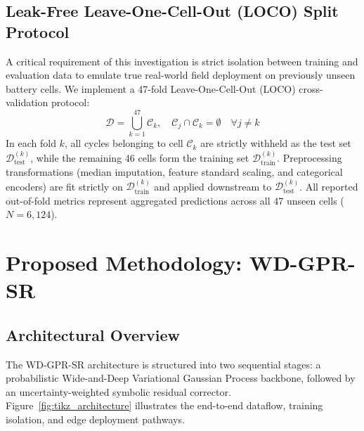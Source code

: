 \documentclass[a4paper,fleqn]{cas-sc}
\begin{document}
\subsection{Leak-Free Leave-One-Cell-Out (LOCO) Split Protocol}
A critical requirement of this investigation is strict isolation between training and evaluation data to emulate true real-world field deployment on previously unseen battery cells. We implement a 47-fold Leave-One-Cell-Out (LOCO) cross-validation protocol:
\begin{equation}
    \mathcal{D} = \bigcup_{k=1}^{47} \mathcal{C}_k, \quad \mathcal{C}_j \cap \mathcal{C}_k = \emptyset \quad \forall j \neq k
\end{equation}
In each fold $k$, all cycles belonging to cell $\mathcal{C}_k$ are strictly withheld as the test set $\mathcal{D}_{\text{test}}^{(k)}$, while the remaining 46 cells form the training set $\mathcal{D}_{\text{train}}^{(k)}$. Preprocessing transformations (median imputation, feature standard scaling, and categorical encoders) are fit strictly on $\mathcal{D}_{\text{train}}^{(k)}$ and applied downstream to $\mathcal{D}_{\text{test}}^{(k)}$. All reported out-of-fold metrics represent aggregated predictions across all 47 unseen cells ($N=6,124$).

\section{Proposed Methodology: WD-GPR-SR}

\subsection{Architectural Overview}
The WD-GPR-SR architecture is structured into two sequential stages: a probabilistic Wide-and-Deep Variational Gaussian Process backbone, followed by an uncertainty-weighted symbolic residual corrector. Figure~\ref{fig:tikz_architecture} illustrates the end-to-end dataflow, training isolation, and edge deployment pathways.
\end{document}
